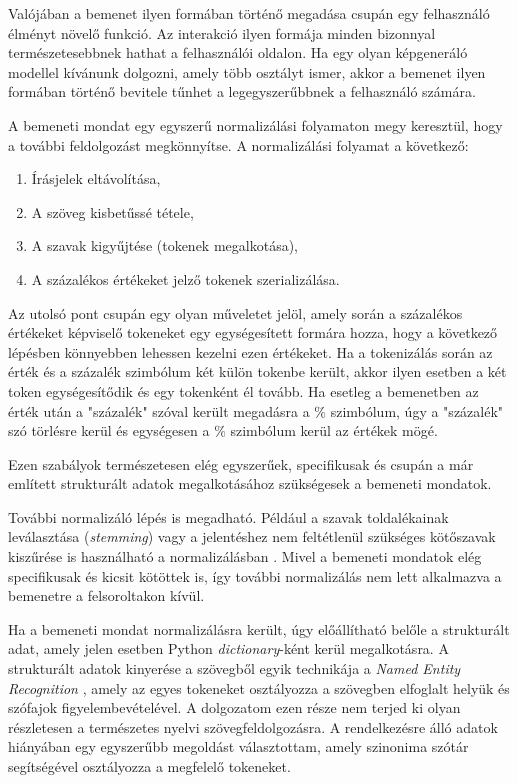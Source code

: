 Valójában a bemenet ilyen formában történő megadása csupán egy felhasználó élményt növelő funkció. Az interakció ilyen formája minden bizonnyal természetesebbnek hathat a felhasználói oldalon. Ha egy olyan képgeneráló modellel kívánunk dolgozni, amely több osztályt ismer, akkor a bemenet ilyen formában történő bevitele tűnhet a legegyszerűbbnek a felhasználó számára.

A bemeneti mondat egy egyszerű normalizálási folyamaton megy keresztül, hogy a további feldolgozást megkönnyítse. A normalizálási folyamat a következő:

\begin{enumerate}
	\item Írásjelek eltávolítása,
	\item A szöveg kisbetűssé tétele,
	\item A szavak kigyűjtése (tokenek megalkotása),
	\item A százalékos értékeket jelző tokenek szerializálása.
\end{enumerate}

Az utolsó pont csupán egy olyan műveletet jelöl, amely során a százalékos értékeket képviselő tokeneket egy egységesített formára hozza, hogy a következő lépésben könnyebben lehessen kezelni ezen értékeket. Ha a tokenizálás során az érték és a százalék szimbólum két külön tokenbe került, akkor ilyen esetben a két token egységesítődik és egy tokenként él tovább. Ha esetleg a bemenetben az érték után a "százalék" szóval került megadásra a $\%$ szimbólum, úgy a "százalék" szó törlésre kerül és egységesen a $\%$ szimbólum kerül az értékek mögé.

Ezen szabályok természetesen elég egyszerűek, specifikusak és csupán a már említett strukturált adatok megalkotásához szükségesek a bemeneti mondatok.

További normalizáló lépés is megadható. Például a szavak toldalékainak leválasztása (\textit{stemming}) vagy a jelentéshez nem feltétlenül szükséges kötőszavak kiszűrése is használható a normalizálásban \cite{bird2009natural}. Mivel a bemeneti mondatok elég specifikusak és kicsit kötöttek is, így további normalizálás nem lett alkalmazva a bemenetre a felsoroltakon kívül.


Ha a bemeneti mondat normalizálásra került, úgy előállítható belőle a strukturált adat, amely jelen esetben Python \textit{dictionary}-ként kerül megalkotásra. A strukturált adatok kinyerése a szövegből egyik technikája a \textit{Named Entity Recognition} \cite{bird2009natural}, amely az egyes tokeneket osztályozza a szövegben elfoglalt helyük és szófajok figyelembevételével. A dolgozatom ezen része nem terjed ki olyan részletesen a természetes nyelvi szövegfeldolgozásra. A rendelkezésre álló adatok hiányában egy egyszerűbb megoldást választottam, amely szinonima szótár segítségével osztályozza a megfelelő tokeneket.

